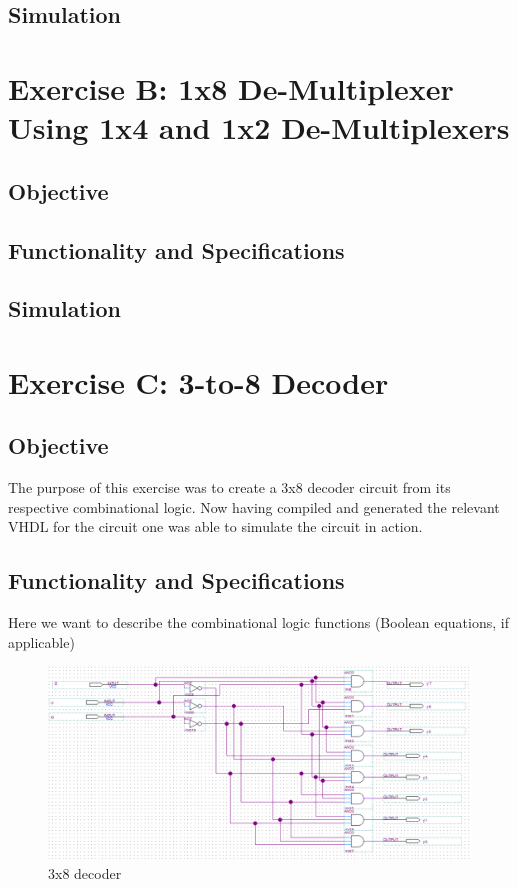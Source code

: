 \documentclass[12pt]{article}
\begin{document}
\subsection{Simulation}
\clearpage


\section{Exercise B: 1x8 De-Multiplexer Using 1x4 and 1x2 De-Multiplexers}
\subsection{Objective}

\subsection{Functionality and Specifications}

\subsection{Simulation}
\clearpage
\section{Exercise C: 3-to-8 Decoder}
\subsection{Objective}
The purpose of this exercise was to create a 3x8 decoder circuit from its respective combinational logic. Now having compiled and generated the relevant VHDL for the circuit one was able to simulate the circuit in action. 

\subsection{Functionality and Specifications}

Here we want to describe the combinational logic functions (Boolean equations, if applicable)

\begin{figure}[h]
\caption{3x8 decoder}
\includegraphics[width=\textwidth]{./diagrams/3x8_decoder.png}
\end{figure}
\end{document}
